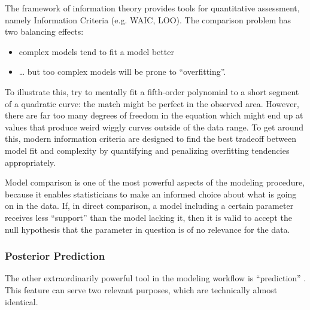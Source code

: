 The framework of information theory provides tools for quantitative assessment, namely Information Criteria (e.g. WAIC, LOO).
The comparison problem has two balancing effects:
\begin{itemize}
\item complex models tend to fit a model better
\item \ldots{} but too complex models will be prone to ``overfitting''.
\end{itemize}

To illustrate this, try to mentally fit a fifth-order polynomial to a short segment of a quadratic curve: the match might be perfect in the observed area.
However, there are far too many degrees of freedom in the equation which might end up at values that produce weird wiggly curves outside of the data range.
To get around this, modern information criteria are designed to find the best tradeoff between model fit and complexity by quantifying and penalizing overfitting tendencies appropriately.

Model comparison is one of the most powerful aspects of the modeling procedure, because it enables statisticians to make an informed choice about what is going on in the data.
If, in direct comparison, a model including a certain parameter receives less ``support'' than the model lacking it, then it is valid to accept the null hypothesis that the parameter in question is of no relevance for the data.


\subsubsection{Posterior Prediction}
\label{workflow:prediction}
The other extraordinarily powerful tool in the modeling workflow is ``prediction'' \citep{Shmueli2010}.
This feature can serve two relevant purposes, which are technically almost identical.

